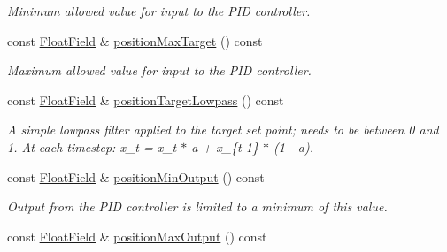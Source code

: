 \begin{DoxyCompactItemize}
\begin{DoxyCompactList}\small\item\em Minimum allowed value for input to the P\+ID controller. \end{DoxyCompactList}\item 
const \hyperlink{classhebi_1_1Info_1_1FloatField}{Float\+Field} \& \hyperlink{classhebi_1_1Info_1_1Settings_1_1Actuator_1_1PositionGains_a355eb5d2a7ba136718861ff85877f30d}{position\+Max\+Target} () const \hypertarget{classhebi_1_1Info_1_1Settings_1_1Actuator_1_1PositionGains_a355eb5d2a7ba136718861ff85877f30d}{}\label{classhebi_1_1Info_1_1Settings_1_1Actuator_1_1PositionGains_a355eb5d2a7ba136718861ff85877f30d}

\begin{DoxyCompactList}\small\item\em Maximum allowed value for input to the P\+ID controller. \end{DoxyCompactList}\item 
const \hyperlink{classhebi_1_1Info_1_1FloatField}{Float\+Field} \& \hyperlink{classhebi_1_1Info_1_1Settings_1_1Actuator_1_1PositionGains_a8e05d15e15b8cb4de5c528bb38af95b1}{position\+Target\+Lowpass} () const \hypertarget{classhebi_1_1Info_1_1Settings_1_1Actuator_1_1PositionGains_a8e05d15e15b8cb4de5c528bb38af95b1}{}\label{classhebi_1_1Info_1_1Settings_1_1Actuator_1_1PositionGains_a8e05d15e15b8cb4de5c528bb38af95b1}

\begin{DoxyCompactList}\small\item\em A simple lowpass filter applied to the target set point; needs to be between 0 and 1. At each timestep\+: x\+\_\+t = x\+\_\+t $\ast$ a + x\+\_\+\{t-\/1\} $\ast$ (1 -\/ a). \end{DoxyCompactList}\item 
const \hyperlink{classhebi_1_1Info_1_1FloatField}{Float\+Field} \& \hyperlink{classhebi_1_1Info_1_1Settings_1_1Actuator_1_1PositionGains_a6b2f755296c35892991c33412cb8e2bc}{position\+Min\+Output} () const \hypertarget{classhebi_1_1Info_1_1Settings_1_1Actuator_1_1PositionGains_a6b2f755296c35892991c33412cb8e2bc}{}\label{classhebi_1_1Info_1_1Settings_1_1Actuator_1_1PositionGains_a6b2f755296c35892991c33412cb8e2bc}

\begin{DoxyCompactList}\small\item\em Output from the P\+ID controller is limited to a minimum of this value. \end{DoxyCompactList}\item 
const \hyperlink{classhebi_1_1Info_1_1FloatField}{Float\+Field} \& \hyperlink{classhebi_1_1Info_1_1Settings_1_1Actuator_1_1PositionGains_a2e1762128783ccda6956cd79fb9c4ce8}{position\+Max\+Output} () const \hypertarget{classhebi_1_1Info_1_1Settings_1_1Actuator_1_1PositionGains_a2e1762128783ccda6956cd79fb9c4ce8}{}\label{classhebi_1_1Info_1_1Settings_1_1Actuator_1_1PositionGains_a2e1762128783ccda6956cd79fb9c4ce8}


\end{DoxyCompactItemize}
